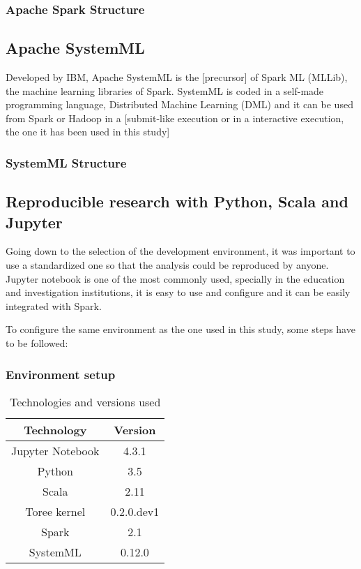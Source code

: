 \documentclass[11pt]{article} %
\begin{document}
    \subsubsection{Apache Spark Structure}




  \subsection{Apache SystemML}

    Developed by IBM, Apache SystemML is the [precursor] of Spark ML (MLLib), the machine learning libraries of Spark.
    SystemML is coded in a self-made programming language, Distributed Machine Learning (DML) and it can be used from Spark or Hadoop in a [submit-like execution or in a interactive execution, the one it has been used in this study]

    \subsubsection{SystemML Structure}



  \subsection{Reproducible research with Python, Scala and Jupyter}

    Going down to the selection of the development environment, it was important to use a standardized one so that the analysis could be reproduced by anyone. Jupyter notebook is one of the most commonly used, specially in the education and investigation institutions, it is easy to use and configure and it can be easily integrated with Spark.

    To configure the same environment as the one used in this study, some steps have to be followed:

    \subsubsection{Environment setup}


    \begin{table}
    \centering
    \begin{tabular}{| c | c |}
    \hline
    Technology & Version \\ \hline
    Jupyter Notebook & 4.3.1 \\ \hline
    Python & 3.5 \\ \hline
    Scala & 2.11 \\ \hline
    Toree kernel & 0.2.0.dev1 \\ \hline
    Spark & 2.1 \\ \hline
    SystemML & 0.12.0 \\ \hline
    \end{tabular}
    \caption{Technologies and versions used}
    \end{table}
\end{document}
